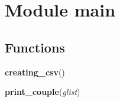 %
%
%


\section{Module main}

    \label{main}


  \subsection{Functions}

    \label{main:creating_csv}

    \vspace{0.5ex}

\hspace{.8\funcindent}\begin{boxedminipage}{\funcwidth}

    \raggedright \textbf{creating\_csv}()

\setlength{\parskip}{2ex}
\setlength{\parskip}{1ex}
    \end{boxedminipage}

    \label{main:print_couple}

    \vspace{0.5ex}

\hspace{.8\funcindent}\begin{boxedminipage}{\funcwidth}

    \raggedright \textbf{print\_couple}(\textit{glist})

\setlength{\parskip}{2ex}
\setlength{\parskip}{1ex}
    \end{boxedminipage}



